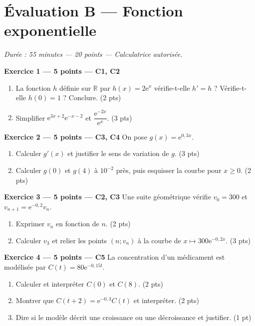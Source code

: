 \section*{Évaluation B — Fonction exponentielle}
\textit{Durée : 55 minutes — 20 points — Calculatrice autorisée.}

\textbf{Exercice 1 — 5 points — C1, C2}
\begin{enumerate}
\item La fonction $h$ définie sur $\mathbb{R}$ par $h(x)=2\mathrm{e}^{x}$ vérifie-t-elle $h'=h$ ? Vérifie-t-elle $h(0)=1$ ? Conclure. \hfill(2 pts)
\item Simplifier $\mathrm{e}^{3x+2}\mathrm{e}^{-x-2}$ et $\dfrac{\mathrm{e}^{-2x}}{\mathrm{e}^{x}}$. \hfill(3 pts)
\end{enumerate}

\textbf{Exercice 2 — 5 points — C3, C4}
On pose $g(x)=\mathrm{e}^{0{,}3x}$.
\begin{enumerate}
\item Calculer $g'(x)$ et justifier le sens de variation de $g$. \hfill(3 pts)
\item Calculer $g(0)$ et $g(4)$ à $10^{-2}$ près, puis esquisser la courbe pour $x\geqslant0$. \hfill(2 pts)
\end{enumerate}

\textbf{Exercice 3 — 5 points — C2, C3}
Une suite géométrique vérifie $v_0=300$ et $v_{n+1}=\mathrm{e}^{-0{,}2}v_n$.
\begin{enumerate}
\item Exprimer $v_n$ en fonction de $n$. \hfill(2 pts)
\item Calculer $v_3$ et relier les points $(n;v_n)$ à la courbe de $x\mapsto300\mathrm{e}^{-0{,}2x}$. \hfill(3 pts)
\end{enumerate}

\textbf{Exercice 4 — 5 points — C5}
La concentration d'un médicament est modélisée par $C(t)=80\mathrm{e}^{-0{,}15t}$.
\begin{enumerate}
\item Calculer et interpréter $C(0)$ et $C(8)$. \hfill(2 pts)
\item Montrer que $C(t+2)=\mathrm{e}^{-0{,}3}C(t)$ et interpréter. \hfill(2 pts)
\item Dire si le modèle décrit une croissance ou une décroissance et justifier. \hfill(1 pt)
\end{enumerate}

